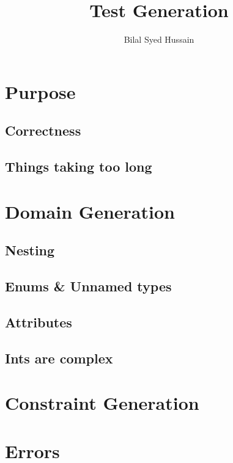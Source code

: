 

\title{Test Generation}
\author{Bilal Syed Hussain}
\pagestyle{plain}


\maketitle

\section{Purpose}

\subsection{Correctness}

\subsection{Things taking too long}


\section{Domain Generation}

\subsection{Nesting}

\subsection{Enums \& Unnamed types}

\subsection{Attributes}

\subsection{Ints are complex}


\section{Constraint Generation}


\section{Errors}

